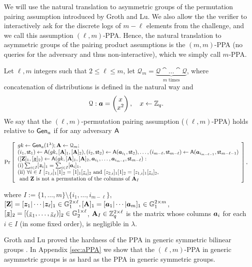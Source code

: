 
We will use the natural translation to asymmetric groups of the permutation pairing assumption introduced by Groth and Lu. We also allow the the verifier to interactively ask for the discrete logs of $m-\ell$ elements from the challenge, and we call this assumption $(\ell,m)$-PPA. Hence, the natural translation to asymmetric groups of the pairing product assumptions is the $(m,m)$-PPA (no queries for the adversary and thus non-interactive), which we simply call $m$-PPA.
\begin{definition}\label{def:ppa}
Let $\ell,m$ integers such that $2\leq \ell \leq m$, let $\mathcal{Q}_{m}=\underbrace{\mathcal{Q}\cat\ldots\cat\mathcal{Q}}_{m\text{ times}}$, where concatenation of  distributions is defined in the natural way and 
$$\mathcal{Q}: {\boldsymbol{a}}=\left(\begin{matrix}x\\x^2\end{matrix}\right),\quad x\gets\mathbb{Z}_q.$$
We say that the $(\ell,m)$-permutation pairing assumption ($(\ell,m)$-PPA) holds relative to $\mathsf{Gen}_a$ if for any adversary $\mathsf{A}$
\begin{small}$$
\Pr\left[
\begin{array}{l}
	gk\gets\mathsf{Gen}_a(1^\lambda);\mathbf{{A}}\gets\mathcal{Q}_{m};\\
	(i_1,\mathsf{st}_1) \gets \mathsf{A}(gk,[\mathbf{{A}}]_1,[\mathbf{{A}}]_2),
	(i_2,\mathsf{st}_2) \gets \mathsf{A}({\boldsymbol{a}}_{i_1},\mathsf{st}_2),
	\ldots,
	(i_{m-\ell},\mathsf{st}_{m-\ell}) \gets \mathsf{A}({\boldsymbol{a}}_{i_{m-\ell-1}},\mathsf{st}_{m-\ell-1})\\
	([\mathbf{{Z}}]_1,[\underline{{\boldsymbol{z}}}]_2)\gets\mathsf{A}(gk,[\mathbf{{A}}]_1,[\mathbf{{A}}]_2, {\boldsymbol{a}}_{i_1},\ldots, {\boldsymbol{a}}_{i_{m-\ell}},\mathsf{st}_{m-\ell}):\\
	\mathrm{(i)} \sum_{i\in I}[{\boldsymbol{z}}_i]_1 = \sum_{i\in I}[{\boldsymbol{a}}_i]_1,\\
	\mathrm{(ii)}\ \forall i\in I \ [z_{1,i}]_1[1]_2=[1]_1[\underline{z}_{i}]_2 \text{ and } [z_{2,i}]_1[1]_2=[z_{1,i}]_1[\underline{z}_{i}]_2,\\
	\text{ and }\mathbf{{Z}}\text{ is not a permutation of the columns of }\mathbf{{A}}_I
\end{array}
\right],
$$\end{small}
where $I:=\{1,\ldots, m\}\setminus \{i_1,\ldots, i_{m-\ell} \}$, $[\mathbf{{Z}}]=[{\boldsymbol{z}}_1|\cdots|{\boldsymbol{z}}_\ell]_1\in\mathbb{G}_1^{2\times \ell}, [\mathbf{{A}}]_1=[{\boldsymbol{a}}_1|\cdots|{\boldsymbol{a}}_m]_1\in\mathbb{G}_1^{2\times m}$, $[\underline{{\boldsymbol{z}}}]_2=\allowbreak[(\underline{z}_1,\ldots,\allowbreak \underline{z}_\ell)]_2\in\mathbb{G}_2^{1\times \ell}$,
$\mathbf{{A}}_I\in \mathbb{Z}_q^{2\times \ell}$ is the matrix whose columns ${\boldsymbol{a}}_i$ for each $i\in I$ (in some fixed order),
 is negligible in $\lambda$.
\end{definition}
Groth and Lu proved the hardness of the PPA in generic symmetric bilinear groups \cite{AC:GroLu07}. In Appendix \ref{sec:aPPA} we show that the $(\ell,m)$-PPA in generic asymmetric groups is as hard as the PPA in generic symmetric groups.

